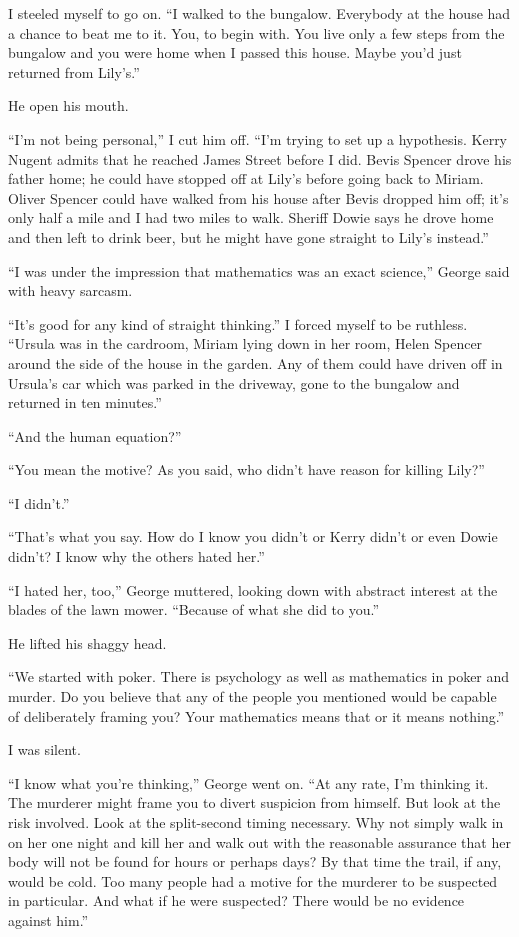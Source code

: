\documentclass{novel}
\begin{document}
I steeled myself to go on. “I walked to the bungalow. Everybody at the house had a chance to beat me to it. You, to begin with. You live only a few steps from the bungalow and you were home when I passed this house. Maybe you’d just returned from Lily’s.”

He open his mouth.

“I’m not being personal,” I cut him off. “I’m trying to set up a hypothesis. Kerry Nugent admits that he reached James Street before I did. Bevis Spencer drove his father home; he could have stopped off at Lily’s before going back to Miriam. Oliver Spencer could have walked from his house after Bevis dropped him off; it’s only half a mile and I had two miles to walk. Sheriff Dowie says he drove home and then left to drink beer, but he might have gone straight to Lily’s instead.”

“I was under the impression that mathematics was an exact science,” George said with heavy sarcasm.

“It’s good for any kind of straight thinking.” I forced myself to be ruthless. “Ursula was in the cardroom, Miriam lying down in her room, Helen Spencer around the side of the house in the garden. Any of them could have driven off in Ursula’s car which was parked in the driveway, gone to the bungalow and returned in ten minutes.”

“And the human equation?”

“You mean the motive? As you said, who didn’t have reason for killing Lily?”

“I didn’t.”

“That’s what you say. How do I know you didn’t or Kerry didn’t or even Dowie didn’t? I know why the others hated her.”

“I hated her, too,” George muttered, looking down with abstract interest at the blades of the lawn mower. “Because of what she did to you.”

He lifted his shaggy head.

“We started with poker. There is psychology as well as mathematics in poker and murder. Do you believe that any of the people you mentioned would be capable of deliberately framing you? Your mathematics means that or it means nothing.”

I was silent.

“I know what you’re thinking,” George went on. “At any rate, I’m thinking it. The murderer might frame you to divert suspicion from himself. But look at the risk involved. Look at the split-second timing necessary. Why not simply walk in on her one night and kill her and walk out with the reasonable assurance that her body will not be found for hours or perhaps days? By that time the trail, if any, would be cold. Too many people had a motive for the murderer to be suspected in particular. And what if he were suspected? There would be no evidence against him.”
\end{document}

